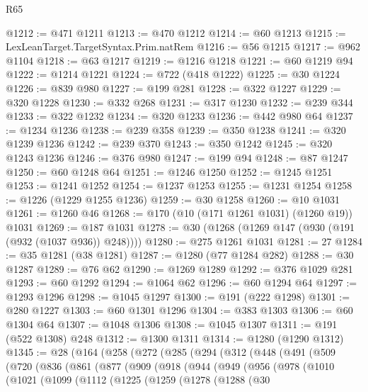 \begin{lexlean}{R65}
\begin{coremodule}
@1212 := @471 @1211
@1213 := @470 @1212
@1214 := @60 @1213
@1215 := LexLeanTarget.TargetSyntax.Prim.natRem
@1216 := @56 @1215
@1217 := @962 @1104
@1218 := @63 @1217
@1219 := @1216 @1218
@1221 := @60 @1219 @94
@1222 := @1214 @1221
@1224 := @722 (@418 @1222)
@1225 := @30 @1224
@1226 := @839 @980
@1227 := @199 @281
@1228 := @322 @1227
@1229 := @320 @1228
@1230 := @332 @268
@1231 := @317 @1230
@1232 := @239 @344
@1233 := @322 @1232
@1234 := @320 @1233
@1236 := @442 @980 @64
@1237 := @1234 @1236
@1238 := @239 @358
@1239 := @350 @1238
@1241 := @320 @1239 @1236
@1242 := @239 @370
@1243 := @350 @1242
@1245 := @320 @1243 @1236
@1246 := @376 @980
@1247 := @199 @94
@1248 := @87 @1247
@1250 := @60 @1248 @64
@1251 := @1246 @1250
@1252 := @1245 @1251
@1253 := @1241 @1252
@1254 := @1237 @1253
@1255 := @1231 @1254
@1258 := @1226 (@1229 @1255 @1236)
@1259 := @30 @1258
@1260 := @10 @1031
@1261 := @1260 @46
@1268 := @170 (@10 (@171 @1261 @1031) (@1260 @19)) @1031
@1269 := @187 @1031
@1278 := @30 (@1268 (@1269 @147 (@930 (@191 (@932 (@1037 @936)) @248))))
@1280 := @275 @1261 @1031
@1281 := 27
@1284 := @35 @1281 (@38 @1281)
@1287 := @1280 (@77 @1284 @282)
@1288 := @30 @1287
@1289 := @76 @62
@1290 := @1269 @1289
@1292 := @376 @1029 @281
@1293 := @60 @1292
@1294 := @1064 @62
@1296 := @60 @1294 @64
@1297 := @1293 @1296
@1298 := @1045 @1297
@1300 := @191 (@222 @1298)
@1301 := @280 @1227
@1303 := @60 @1301 @1296
@1304 := @383 @1303
@1306 := @60 @1304 @64
@1307 := @1048 @1306
@1308 := @1045 @1307
@1311 := @191 (@522 @1308) @248
@1312 := @1300 @1311
@1314 := @1280 (@1290 @1312)
@1345 := @28
    (@164
      (@258
        (@272
          (@285
            (@294
              (@312
                (@448
                  (@491
                    (@509
                      (@720
                        (@836
                          (@861
                            (@877
                              (@909
                                (@918
                                  (@944
                                    (@949
                                      (@956
                                        (@978
                                          (@1010
                                            (@1021
                                              (@1099
                                                (@1112
                                                  (@1225
                                                    (@1259
                                                      (@1278
                                                        (@1288
                                                          (@30

\end{coremodule}
\end{lexlean}
